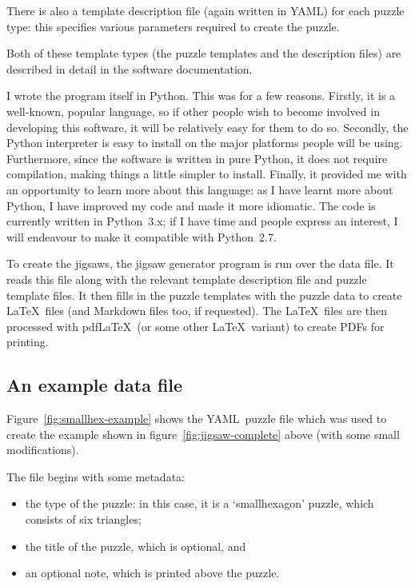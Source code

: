 \documentclass{article}
\def\YAML{{\small YAML}}
\def\PDF{{\small PDF}}
\begin{document}
There is also a template description file (again written in \YAML) for
each puzzle type: this specifies various parameters required to create
the puzzle.

Both of these template types (the puzzle templates and the description
files) are described in detail in the software documentation.

I wrote the program itself in Python.  This was for a few reasons.
Firstly, it is a well-known, popular language, so if other people wish
to become involved in developing this software, it will be relatively
easy for them to do so.  Secondly, the Python interpreter is easy to
install on the major platforms people will be using.  Furthermore,
since the software is written in pure Python, it does not require
compilation, making things a little simpler to install.  Finally, it
provided me with an opportunity to learn more about this language: as
I have learnt more about Python, I have improved my code and made it
more idiomatic.  The code is currently written in Python~3.x; if I
have time and people express an interest, I will endeavour to make it
compatible with Python~2.7.

To create the jigsaws, the jigsaw generator program is run over the
data file.  It reads this file along with the relevant template
description file and puzzle template files.  It then fills in the
puzzle templates with the puzzle data to create \LaTeX\ files (and
Markdown files too, if requested).  The \LaTeX\ files are then
processed with pdf\LaTeX\ (or some other \LaTeX\ variant) to create
\PDF s for printing.

\subsection{An example data file}

Figure~\ref{fig:smallhex-example} shows the \YAML\ puzzle file which
was used to create the example shown in
figure~\ref{fig:jigsaw-complete} above (with some small
modifications).

The file begins with some metadata:
\begin{itemize}
\item the type of the puzzle: in this case, it is a `smallhexagon'
  puzzle, which consists of six triangles;
\item the title of the puzzle, which is optional, and
\item an optional note, which is printed above the puzzle.
\end{itemize}
\end{document}
